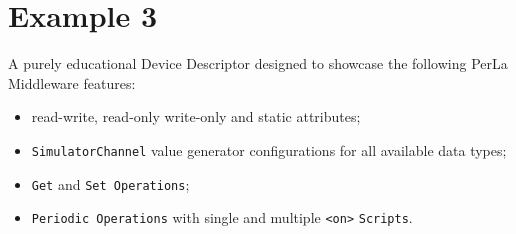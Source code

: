 \section{Example 3}

A purely educational Device Descriptor designed to showcase the following PerLa
Middleware features:

\begin{itemize}
    \item read-write, read-only write-only and static attributes;
    \item \texttt{SimulatorChannel} value generator configurations for all
        available data types;
    \item \texttt{Get} and \texttt{Set Operations};
    \item \texttt{Periodic Operations} with single and multiple
        \lstinline!<on>! \texttt{Scripts}.
\end{itemize}

